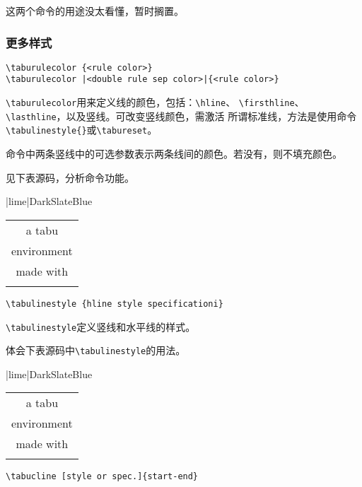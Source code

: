 \documentclass{article}
\begin{document}
这两个命令的用途没太看懂，暂时搁置。

\subsubsection{更多样式}

\begin{verbatim}
\taburulecolor {<rule color>}
\taburulecolor |<double rule sep color>|{<rule color>}
\end{verbatim}

\verb!\taburulecolor!用来定义线的颜色，包括：\verb!\hline!、
\verb!\firsthline!、\verb!\lasthline!，以及竖线。可改变竖线颜色，需激活
所谓标准线，方法是使用命令\verb!\tabulinestyle{}!或\verb!\tabureset!。

命令中两条竖线中的可选参数表示两条线间的颜色。若没有，则不填充颜色。

见下表源码，分析命令功能。

\begin{table}[H]
  \centering
  \taburulecolor|lime|{DarkSlateBlue}
  \arrayrulewidth =1mm \doublerulesep=2mm
  \begin{tabu} spread 0pt {|c|}
  \firsthline \hline
  a tabu \\
  environment \\
  made with \\
  \lasthline[5mm] \hline \hline
  \end{tabu} 
\end{table}

\begin{verbatim}
\tabulinestyle {hline style specificationi}
\end{verbatim}

\verb!\tabulinestyle!定义竖线和水平线的样式。

体会下表源码中\verb!\tabulinestyle!的用法。

\begin{table}[H]
  \centering
  \taburulecolor|lime|{DarkSlateBlue}
  \begin{tabu} spread 0pt {|c|}
  \firsthline \hline
  a tabu \\
  environment \\
  made with \\
  \lasthline[5mm] \hline \hline
  \end{tabu} 
\end{table}

\begin{verbatim}
\tabucline [style or spec.]{start-end}
\end{verbatim}
\end{document}
